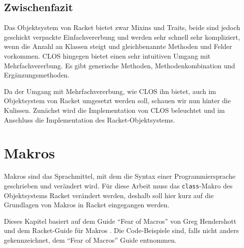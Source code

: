 
\pagestyle{diplHeadings}





\setcounter{page}{1}
\tableofcontents
\cleardoublepage 

\setcounter{page}{1} 
\mainmatter  
{}





\section{Zwischenfazit}
Das Objektsystem von Racket bietet zwar Mixins und Traits, beide sind jedoch geschickt verpackte Einfachvererbung und werden sehr schnell sehr kompliziert, wenn die Anzahl an Klassen steigt und gleichbenannte Methoden und Felder vorkommen. CLOS hingegen bietet einen sehr intuitiven Umgang mit Mehrfachvererbung. Es gibt generische Methoden, Methodenkombination und Ergänzungsmethoden.

Da der Umgang mit Mehrfachvererbung, wie CLOS ihn bietet, auch im Objektsystem von Racket umgesetzt werden soll, schauen wir nun hinter die Kulissen. Zunächst wird die Implementation von CLOS beleuchtet und im Anschluss die Implementation des Racket-Objektsystems.




\chapter{Makros} 
\label{makros}
Makros sind das Sprachmittel, mit dem die Syntax einer Programmiersprache geschrieben und verändert wird. Für diese Arbeit muss das \texttt{class}-Makro des Objektsystems Racket verändert werden, deshalb soll hier kurz auf die Grundlagen von Makros in Racket eingegangen werden.

Dieses Kapitel basiert auf dem Guide ``Fear of Macros'' von Greg Hendershott \cite{fearofmacros} und dem Racket-Guide für Makros \cite{racketguide-macros}. Die Code-Beispiele sind, falls nicht anders gekennzeichnet, dem ``Fear of Macros'' Guide entnommen.


